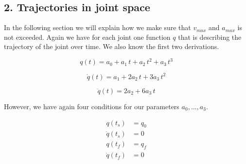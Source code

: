 \documentclass[a4paper,12pt]{article}
\begin{document}






\subsection*{2. Trajectories in joint space}
In the following section we will explain how we make sure that $v_{max}$ and $a_{max}$ is not exceeded. Again we have for each joint one function $q$ that is describing the trajectory of the joint over time. We also know the first two derivations.

\[
q(t) = a_0 + a_1\, t + a_2\, t^2 + a_3\, t^3
\]

\[
\dot{q}(t) = a_1 + 2 a_2\, t + 3 a_3\, t^2
\]

\[
\ddot{q}(t) = 2 a_2 + 6 a_3\, t
\]

However, we have again four conditions for our parameters $a_0, ..., a_3$.

\begin{align*}
q(t_s) &= q_0 \\
\dot{q}(t_s) &= 0 \\
q(t_f) &= q_f \\
\dot{q}(t_f) &= 0
\end{align*}
\end{document}
